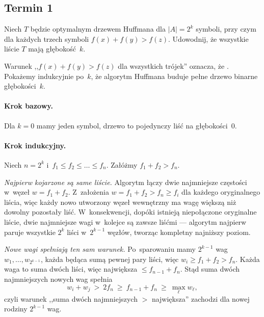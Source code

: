 \subsection{Termin 1}

\begin{zadanie}
	Niech $T$ będzie optymalnym drzewem Huffmana dla $|A|=2^k$ symboli, przy czym
	dla każdych trzech symboli $f(x)+f(y)>f(z)$. Udowodnij, że wszystkie liście
	$T$ mają głębokość~$k$.
\end{zadanie}

Warunek ,,$f(x)+f(y)>f(z)$ dla wszystkich trójek'' oznacza, że . Pokażemy indukcyjnie po~$k$,
że algorytm Huffmana buduje pełne drzewo binarne głębokości~$k$.

\paragraph{Krok bazowy.}
Dla $k=0$ mamy jeden symbol, drzewo to pojedynczy liść na głębokości~$0$.

\paragraph{Krok indukcyjny.}
Niech $n=2^k$ i~$f_1\le f_2\le\dots\le f_n$. Załóżmy $f_1+f_2>f_n$.

\emph{Najpierw kojarzone są same liście.} Algorytm łączy dwie najmniejsze
częstości w~węzeł $w=f_1+f_2$. Z~założenia $w=f_1+f_2>f_n\ge f_i$ dla każdego
oryginalnego liścia, więc każdy nowo utworzony węzeł wewnętrzny ma wagę większą
niż dowolny pozostały liść. W~konsekwencji, dopóki istnieją niepołączone
oryginalne liście, dwie najmniejsze wagi w~kolejce są zawsze liśćmi --- algorytm
najpierw paruje wszystkie $2^k$ liści w~$2^{k-1}$ węzłów, tworząc kompletny
najniższy poziom.

\emph{Nowe wagi spełniają ten sam warunek.} Po~sparowaniu mamy $2^{k-1}$ wag
$w_1,\dots,w_{2^{k-1}}$, każda będąca sumą pewnej pary liści, więc
$w_i\ge f_1+f_2>f_n$. Każda waga to suma dwóch liści, więc największa
$\le f_{n-1}+f_n$. Stąd suma dwóch najmniejszych nowych wag spełnia
\[
	w_i+w_j\ >\ 2f_n\ \ge\ f_{n-1}+f_n\ \ge\ \max_\ell w_\ell,
\]
czyli warunek ,,suma dwóch najmniejszych $>$ największa'' zachodzi dla nowej
rodziny $2^{k-1}$ wag.

